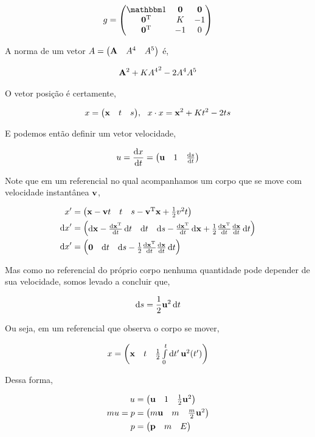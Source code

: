 \documentclass[twoside]{amsart}
\numberwithin{equation}{section}
\begin{document}
\begin{align}
    g=\mqty(\mathbbm 1&\vb 0&\vb 0\\\vb 0^{\textup T}&K&-1\\\vb 0^{\textup T}&-1&0 )
\end{align}

A norma de um vetor $A=\mqty(\vb A&A^4&A^5)$ é,

\begin{align}
    \vb A^2+K{A^4}^2-2A^4A^5
\end{align}

O vetor posição é certamente,

\begin{align}
    x=\mqty(\vb x&t&s),\ \ x\cdot x=\vb x^2+Kt^2-2ts
\end{align}

E podemos então definir um vetor velocidade, 

\begin{align}
    u=\dv{x}{t}=\mqty(\vb u&1&\dv{s}{t})
\end{align}

Note que em um referencial no qual acompanhamos um corpo que se move com velocidade instantânea $\vb v$,

\begin{align}
    x'&=\mqty(\vb x-\vb vt&t&s-\vb v^{\textup T}\vb x+\frac12 v^2t)\\
    \dd{x}'&=\mqty(\dd{\vb x}-\dv{\vb x^{\textup T}}{t}\dd{t}&\dd{t}&\dd{s}-\dv{\vb x^{\textup T}}{t}\dd{\vb x}+\frac12 \dv{\vb x^{\textup T}}{t}\dv{\vb x}{t}\dd{t})\\
    \dd{x}'&=\mqty(\vb 0&\dd{t}&\dd{s}-\frac12 \dv{\vb x^{\textup T}}{t}\dv{\vb x}{t}\dd{t})
\end{align}

Mas como no referencial do próprio corpo nenhuma quantidade pode depender de sua velocidade, somos levado a concluir que,

\begin{align}
    \dd{s}=\frac12\vb u^2\dd{t}
\end{align}

Ou seja, em um referencial que observa o corpo se mover,

\begin{align}
    x=\mqty(\vb x&t&\frac12\int\limits_{0}^{t}\dd{t'}\vb u^2\qty(t'))
\end{align}

Dessa forma,

\begin{align}
    u&=\mqty(\vb u&1 &\frac12 \vb u^2)\\
    mu=p&=\mqty(m\vb u&m&\frac m2 \vb u^2)\\
    p&=\mqty(\vb p&m&E)
\end{align}
\end{document}
